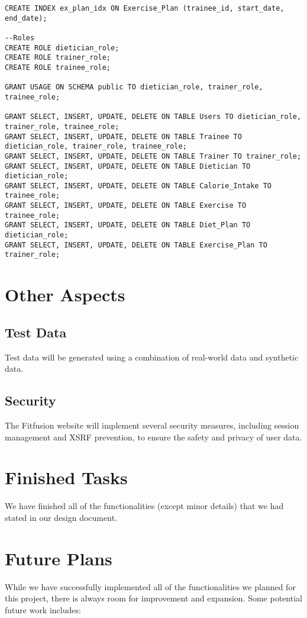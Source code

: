 \documentclass{article}
\begin{document}
\begin{verbatim}
CREATE INDEX ex_plan_idx ON Exercise_Plan (trainee_id, start_date, end_date);

--Roles 
CREATE ROLE dietician_role;
CREATE ROLE trainer_role;
CREATE ROLE trainee_role;

GRANT USAGE ON SCHEMA public TO dietician_role, trainer_role, trainee_role;

GRANT SELECT, INSERT, UPDATE, DELETE ON TABLE Users TO dietician_role, trainer_role, trainee_role;
GRANT SELECT, INSERT, UPDATE, DELETE ON TABLE Trainee TO dietician_role, trainer_role, trainee_role;
GRANT SELECT, INSERT, UPDATE, DELETE ON TABLE Trainer TO trainer_role;
GRANT SELECT, INSERT, UPDATE, DELETE ON TABLE Dietician TO dietician_role;
GRANT SELECT, INSERT, UPDATE, DELETE ON TABLE Calorie_Intake TO trainee_role;
GRANT SELECT, INSERT, UPDATE, DELETE ON TABLE Exercise TO trainee_role;
GRANT SELECT, INSERT, UPDATE, DELETE ON TABLE Diet_Plan TO dietician_role;
GRANT SELECT, INSERT, UPDATE, DELETE ON TABLE Exercise_Plan TO trainer_role;

\end{verbatim}

\section{Other Aspects}

\subsection{Test Data}
Test data will be generated using a combination of real-world data and synthetic data.

\subsection{Security}
The Fitfusion website will implement several security measures, including session management and XSRF prevention, to ensure the safety and privacy of user data.

\section{Finished Tasks}
We have finished all of the functionalities (except minor details) that we had stated in our design document. 

\section{Future Plans}
While we have successfully implemented all of the functionalities we planned for this project, there is always room for improvement and expansion. Some potential future work includes:
\end{document}
